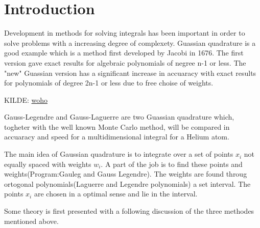 \documentclass[../main.tex]{subfiles}
\begin{document}
\section{Introduction} \label{sec:intro}
Development in methods for solving integrals has been important in order to solve problems with a increasing degree of complexety. Guassian quadrature is a good example which is a method first developed by Jacobi in 1676. The first version gave exact results for algebraic polynomials of negree n-1 or less. The "new" Guassian version has a significant increase in accuaracy with exact results for polynomials of degree 2n-1 or less due to free choise of weights.


KILDE:
\href{https://www.jstor.org/stable/24898684?seq=2#metadata_info_tab_contents}{woho}

Gauss-Legendre and Gauss-Laguerre are two Guassian quadrature which, togheter with the well known Monte Carlo method, will be compared in accuaracy and speed for a multidimensional integral for a Helium atom.

The main idea of Gaussian quadrature is to integrate over a set of points $x_i$ not equally spaced with weights $w_i$. A part of the job is to find these points and weights(Program:Gauleg and Gauss Legendre). The weights are found throug ortogonal polynomials(Laguerre and Legendre polynomials) a set interval. The points $x_i$ are chosen in a optimal sense and lie in the interval.

Some theory is first presented with a following discussion of the three methodes mentioned above.
\end{document}
